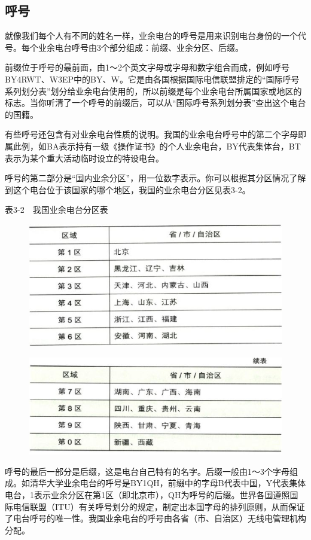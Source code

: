 \documentclass[12pt,UTF8]{ctexbook}
\begin{document}
\subsection{呼号}

就像我们每个人有不同的姓名一样，业余电台的呼号是用来识别电台身份的一个代号。每个业余电台呼号由3个部分组成：前缀、业余分区、后缀。

前缀位于呼号的最前面，由1～2个英文字母或字母和数字组合而成，例如呼号BY4RWT、W3EP中的BY、W。它是由各国根据国际电信联盟排定的“国际呼号系列划分表”划分给业余电台使用的，所以前缀是每个业余电台所属国家或地区的标志。当你听清了一个呼号的前缀后，可以从“国际呼号系列划分表”查出这个电台的国籍。

有些呼号还包含有对业余电台性质的说明。我国的业余电台呼号中的第二个字母即属此例，如BA表示持有一级《操作证书》的个人业余电台，BY代表集体台，BT表示为某个重大活动临时设立的特设电台。

呼号的第二部分是“国内业余分区”，用一位数字表示。你可以根据其分区情况了解到这个电台位于该国家的哪个地区，我国的业余电台分区见表3-2。

表3-2　我国业余电台分区表

\begin{figure}[htbp]
	\centering
	\includegraphics[width=0.7\linewidth]{31}
	\caption{}
	\label{fig:1}
\end{figure}

\begin{figure}[htbp]
	\centering
	\includegraphics[width=0.7\linewidth]{32}
	\caption{}
	\label{fig:1}
\end{figure}

呼号的最后一部分是后缀，这是电台自己特有的名字。后缀一般由1～3个字母组成。如清华大学业余电台的呼号是BY1QH，前缀中的字母B代表中国，Y代表集体电台，1表示业余分区在第1区（即北京市），QH为呼号的后缀。世界各国遵照国际电信联盟（ITU）有关呼号划分的规定，制定出本国字母的排列原则，从而保证了电台呼号的唯一性。我国业余电台的呼号由各省（市、自治区）无线电管理机构分配。
\end{document}

